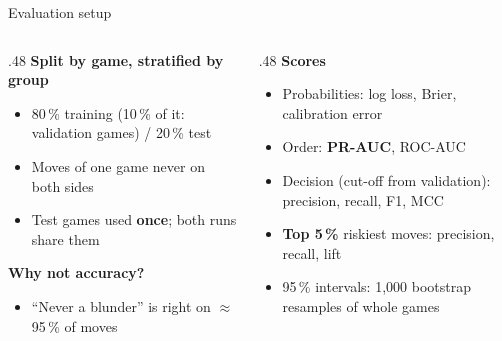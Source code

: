 \documentclass[aspectratio=169,11pt]{beamer}
\newcommand{\hl}[1]{\textcolor{accent}{\textbf{#1}}}
\begin{document}
\begin{frame}{Evaluation setup}
  \small
  \begin{columns}[t]
    \begin{column}{.48\textwidth}
      \hl{Split by game, stratified by group}
      \begin{itemize}
        \item 80\,\% training (10\,\% of it: validation games) / 20\,\% test
        \item Moves of one game never on both sides
        \item Test games used \textbf{once}; both runs share them
      \end{itemize}
      \hl{Why not accuracy?}
      \begin{itemize}
        \item ``Never a blunder'' is right on $\approx$ 95\,\% of moves
      \end{itemize}
    \end{column}
    \begin{column}{.48\textwidth}
      \hl{Scores}
      \begin{itemize}
        \item Probabilities: log loss, Brier, calibration error
        \item Order: \textbf{PR-AUC}, ROC-AUC
        \item Decision (cut-off from validation): precision, recall, F1, MCC
        \item \textbf{Top 5\,\%} riskiest moves: precision, recall, lift
        \item 95\,\% intervals: 1,000 bootstrap resamples of whole games
      \end{itemize}
    \end{column}
  \end{columns}
\end{frame}
\end{document}
